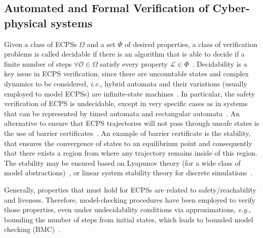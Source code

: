 \documentclass[format=acmsmall, review=false, screen=true]{acmart}
\begin{document}







\subsection{Automated and Formal Verification of Cyber-physical systems}
\label{ssec:verification}

Given a class of ECPSs $\Omega$ and a set $\Phi$ of desired properties, a class of verification problems is called decidable if there is an algorithm that is able to decide if a finite number of steps $\forall \mathcal{O}\in\Omega$ satisfy every property $\mathcal{L}\in \Phi$~\cite{Alur00}. Decidability is a key issue in ECPS verification, since there are uncountable states and complex dynamics to be considered, {\it i.e.}, hybrid automata and their variations (usually employed to model ECPSs) are infinite-state machines~\cite{Henzinger95}. In particular, the safety verification of ECPS is undecidable, except in very specific cases as in systems that can be represented by timed automata and rectangular automata~\cite{Alur11}. An alternative to ensure that ECPS trajectories will not pass through unsafe states is the use of barrier certificates~\cite{Prajna07,Prajna04}. An example of barrier certificate is the stability, that ensures the convergence of states to an equilibrium point and consequently that there exists a region from where any trajectory remains inside of this region. The stability may be ensured based on Lyapunov theory (for a wide class of model abstractions)~\cite{tabuada2009verification}, or linear system stability theory for discrete simulations~\cite{Bessa17}. 


Generally, properties that must hold for ECPSs are related to safety/reachability and liveness. Therefore, model-checking procedures have been employed to verify those properties, even under undecidability conditions via approximations, {\it e.g.}, bounding the number of steps from initial states, which leads to bounded model checking (BMC)~\cite{Veanes09}. 
\end{document}
